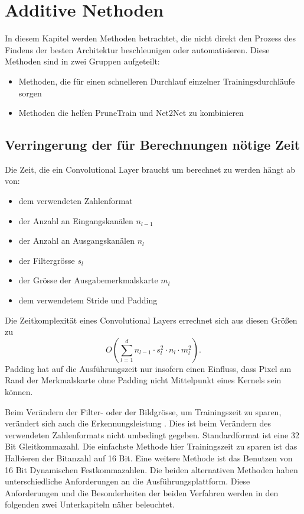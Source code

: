 \section{Additive Nethoden}\label{sec:add}
\color{blue1}
In diesem Kapitel werden Methoden betrachtet, die nicht direkt den Prozess des Findens der besten Architektur beschleunigen oder automatisieren. 
Diese Methoden sind in zwei Gruppen aufgeteilt:
\begin{itemize}
 \item Methoden, die für einen schnelleren Durchlauf einzelner Trainingsdurchläufe sorgen
 \item Methoden die helfen PruneTrain und Net2Net zu kombinieren
\end{itemize}

\color{black}
\subsection{Verringerung der für Berechnungen nötige Zeit}\label{sec:fp16}
Die Zeit, die ein Convolutional Layer braucht um berechnet zu werden hängt ab von:
\begin{itemize}
 \item dem verwendeten Zahlenformat
 \item der Anzahl an Eingangskanälen $n_{l-1}$
 \item der Anzahl an Ausgangskanälen $n_l$
 \item der Filtergr\"osse $s_l$
 \item der Grösse der Ausgabemerkmalskarte $m_l$ 
 \item dem verwendetem Stride und Padding
\end{itemize}
Die Zeitkomplexität eines Convolutional Layers errechnet sich aus diesen Größen zu \cite{complex}
\begin{equation}
 O\left( \sum_{l=1}^{d} n_{l-1} \cdot s^2_l \cdot n_l \cdot m_l^2 \right) .
\end{equation}
Padding hat auf die Ausführungszeit nur insofern einen Einfluss, dass Pixel am Rand der Merkmalskarte ohne Padding nicht Mittelpunkt eines Kernels sein können. 


Beim Verändern der Filter- oder der Bildgr\"osse, um Trainingszeit zu sparen, ver\"andert sich auch die Erkennungsleistung . Dies ist beim Verändern des verwendeten Zahlenformats nicht umbedingt gegeben. Standardformat ist eine 32 Bit Gleitkommazahl. Die einfachste Methode hier Trainingszeit zu sparen ist das Halbieren der Bitanzahl auf 16 Bit. Eine weitere Methode ist das Benutzen von 16 Bit Dynamischen Festkommazahlen.
Die beiden alternativen Methoden haben unterschiedliche Anforderungen an die Ausführungsplattform. Diese Anforderungen und die Besonderheiten der beiden Verfahren werden in den folgenden zwei Unterkapiteln näher beleuchtet.


